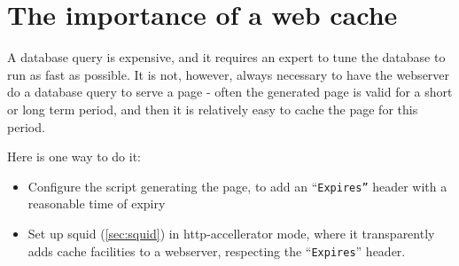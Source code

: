 \section{The importance of a web cache}
\label{sec:the-importance-of-a-web-cache}

A database query is expensive, and it requires an expert to tune the
database to run as fast as possible.  It is not, however, always
necessary to have the webserver do a database query to serve a page -
often the generated page is valid for a short or long term period,
and then it is relatively easy to cache the page for this period.

Here is one way to do it:

\begin{itemize}
\item Configure the script generating the page, to add an
  ``\texttt{Expires''} header with a reasonable time of expiry
\item Set up squid (\vref{sec:squid}) in http-accellerator mode, where
  it transparently adds cache facilities to a webserver, respecting
  the ``\texttt{Expires}'' header.
\end{itemize}

